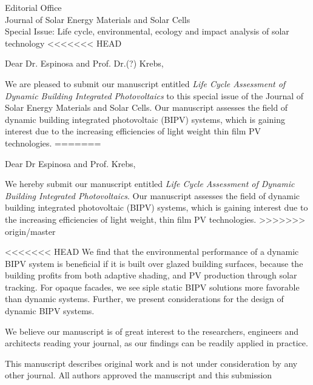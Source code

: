\documentclass[a4paper,12pt]{letter}
\begin{document}
\begin{letter}{Editorial Office \\ Journal of Solar Energy Materials and Solar Cells\\ Special Issue: Life cycle, environmental, ecology and impact analysis of solar technology}
<<<<<<< HEAD
	\opening{Dear Dr. Espinosa and Prof. Dr.(?) Krebs,}
	We are pleased to submit our manuscript entitled \emph{Life Cycle Assessment of Dynamic Building Integrated Photovoltaics} to this special issue of the Journal of Solar Energy Materials and Solar Cells. 
	Our manuscript assesses the field of dynamic building integrated photovoltaic (BIPV) systems, which is gaining interest due to the increasing efficiencies of light weight thin film PV technologies. 
=======
	\opening{Dear Dr Espinosa and Prof. Krebs,}
	We hereby submit our manuscript entitled \emph{Life Cycle Assessment of Dynamic Building Integrated Photovoltaics}. 
	Our manuscript assesses the field of dynamic building integrated photovoltaic (BIPV) systems, which is gaining interest due to the increasing efficiencies of light weight, thin film PV technologies. 
>>>>>>> origin/master



<<<<<<< HEAD
	We find that the environmental performance of a dynamic BIPV system is beneficial if it is built over glazed building surfaces, because the building profits from both adaptive shading, and PV production through solar tracking. For opaque facades, we see siple static BIPV solutions more favorable than dynamic systems. Further, we present considerations for the design of dynamic BIPV systems.
	
	We believe our manuscript is of great interest to the researchers, engineers and architects reading your journal, as our findings can be readily applied in practice.

	This manuscript describes original work and is not under consideration by any other journal. All authors approved the manuscript and this submission


\end{letter}
\end{document}
